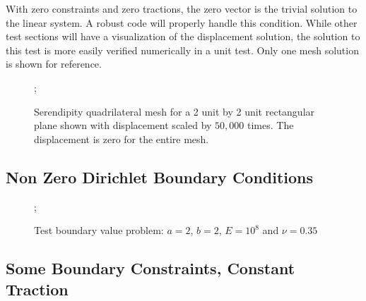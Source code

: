 \documentclass{article}
\begin{document}
With zero constraints and zero tractions, the zero vector is the trivial solution to the linear system. A robust code will properly handle this condition. While other test sections will have a visualization of the displacement solution, the solution to this test is more easily verified numerically in a unit test. Only one mesh solution is shown for reference.

\begin{figure}
    ;
    \caption{Serendipity quadrilateral mesh for a 2 unit by 2 unit rectangular plane shown with displacement scaled by $50,000$ times. The displacement is zero for the entire mesh.}
\centering
\end{figure}

\FloatBarrier
\subsection{Non Zero Dirichlet Boundary Conditions}
\FloatBarrier

\begin{figure}
    ;
    \caption{Test boundary value problem: $a = 2$, $b = 2$, $E = 10^8$ and $\nu = 0.35$}
\centering
\end{figure}

\FloatBarrier
\subsection{Some Boundary Constraints, Constant Traction}
\label{subsec:simple_traction}
\FloatBarrier
\end{document}
